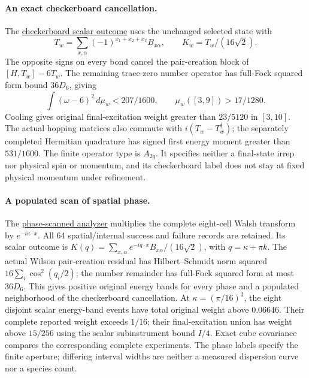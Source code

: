 \paragraph{An exact checkerboard cancellation.}
The \href{https://github.com/FloatingPragma/observer-patch-holography/blob/main/model/particle_primary_staggered_response/PROOF.md}{checkerboard scalar outcome}
uses the unchanged selected state with
\[
 T_w=\sum_{x,\alpha}(-1)^{x_1+x_2+x_3}B_{x\alpha},\qquad K_w=T_w/(16\sqrt2).
\]
The opposite signs
on every bond cancel the pair-creation block of $[H,T_w]-6T_w$.
The remaining trace-zero number operator has full-Fock squared form bound
$36D_6$, giving
\[
 \int(\omega-6)^2\,d\mu_w<207/1600,\qquad
 \mu_w([3,9])>17/1280.
\]
Cooling gives original final-excitation weight greater than $23/5120$
in $[3,10]$. The actual hopping matrices also commute with
$i(T_w-T_w^\dagger)$; the separately completed Hermitian quadrature
has signed first energy moment greater than $531/1600$.
The finite operator type is $A_{2g}$. It specifies neither a final-state
irrep nor physical spin or momentum, and its checkerboard label does not
stay at fixed physical momentum under refinement.

\paragraph{A populated scan of spatial phase.}
The \href{https://github.com/FloatingPragma/observer-patch-holography/blob/main/model/particle_primary_populated_momentum/PROOF.md}{phase-scanned analyzer}
multiplies the complete eight-cell Walsh transform by $e^{-i\kappa\cdot x}$.
All 64 spatial/internal success and failure records are retained. Its scalar
outcome is $K(q)=\sum_{x,\alpha}e^{-iq\cdot x}B_{x\alpha}/(16\sqrt2)$,
with $q=\kappa+\pi k$. The actual Wilson pair-creation residual has
Hilbert--Schmidt norm squared $16\sum_i\cos^2(q_i/2)$; the number remainder
has full-Fock squared form at most $36D_6$. This gives positive original
energy bands for every phase and a populated neighborhood of the
checkerboard cancellation. At $\kappa=(\pi/16)^3$, the eight disjoint
scalar energy-band events have total original weight above $0.06646$.
Their complete reported weight exceeds $1/16$; their final-excitation
union has weight above $15/256$ using the scalar subinstrument bound $I/4$.
Exact cube covariance compares the corresponding complete experiments.
The phase labels specify the finite aperture; differing interval widths
are neither a measured dispersion curve nor a species count.

